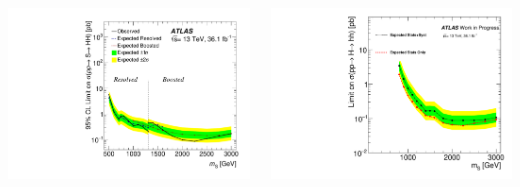 \documentclass{beamer}
\newcommand*{\header}[1]{\fontsize{16}{8}\selectfont \textbf{{\color{MyPurple}{#1}}}}
\begin{document}
\begin{frame}
\begin{center}
\header{Results}
\end{center}
\begin{columns}
\begin{column}{0.5\textwidth}
\begin{center}
\color{MyPurple}{Published Analysis}
\includegraphics[width=01\textwidth]{figures/limit_2016_reOpt_HiggsApproved_Scalar_Paper_Combined_20190312_01}
\end{center}
\end{column}
\begin{column}{0.5\textwidth}
\begin{center}
\color{MyPurple}{Improved Analysis}
\includegraphics[width=01\textwidth]{figures/Final_limits}
\end{center}
\end{column}
\end{columns}
\end{frame}
\end{document}
